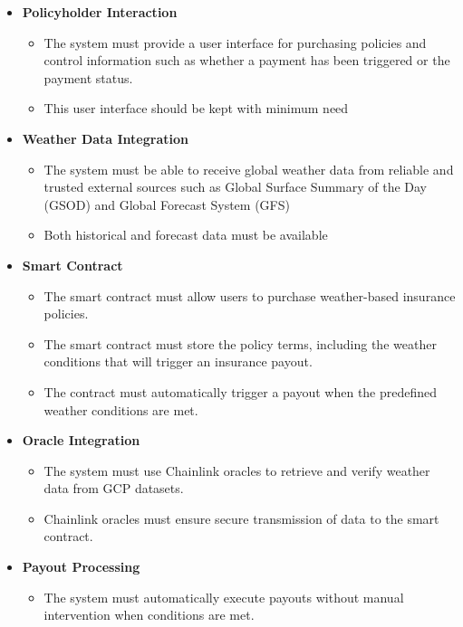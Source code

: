 \begin{itemize}
    \item \textbf{Policyholder Interaction}
    \begin{itemize}
        \item The system must provide a user interface for purchasing policies and control information such as whether a payment has been triggered or the payment status. 
        \item This user interface should be kept with minimum need
    \end{itemize}


    \item \textbf{Weather Data Integration} 
    \begin{itemize}
        \item The system must be able to receive global weather data from reliable and trusted external sources such as Global Surface Summary of the Day (GSOD) and Global Forecast System (GFS)
        \item Both historical and forecast data must be available
    \end{itemize}
    
    
    \item \textbf{Smart Contract}
    \begin{itemize}
        \item The smart contract must allow users to purchase weather-based insurance policies.
        \item The smart contract must store the policy terms, including the weather conditions that will trigger an insurance payout.
        \item The contract must automatically trigger a payout when the predefined weather conditions are met.
    \end{itemize}
    
    \item \textbf{Oracle Integration}
    \begin{itemize}
        \item The system must use Chainlink oracles to retrieve and verify weather data from GCP datasets.
        \item Chainlink oracles must ensure secure transmission of data to the smart contract.
    \end{itemize}
    
    
    
    \item \textbf{Payout Processing}
    \begin{itemize}
        \item The system must automatically execute payouts without manual intervention when conditions are met.
    \end{itemize}
\end{itemize}

